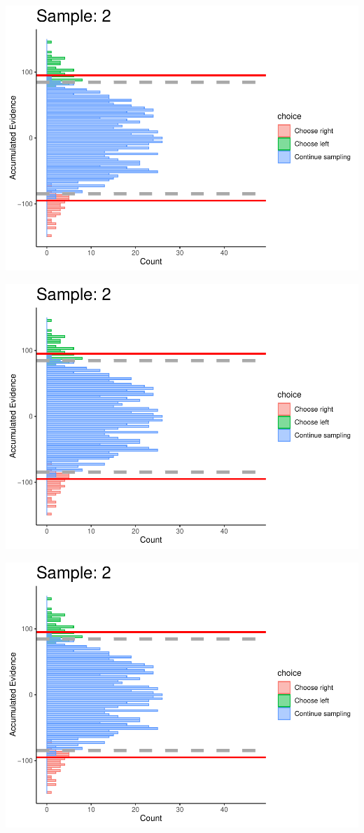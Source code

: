 \documentclass[
]{book}
\begin{document}
\begin{center}\includegraphics[width=0.8\linewidth]{LateNightBayes_files/figure-latex/collapsing_dcb-11} \end{center}

\begin{center}\includegraphics[width=0.8\linewidth]{LateNightBayes_files/figure-latex/collapsing_dcb-12} \end{center}

\begin{center}\includegraphics[width=0.8\linewidth]{LateNightBayes_files/figure-latex/collapsing_dcb-13} \end{center}
\end{document}
